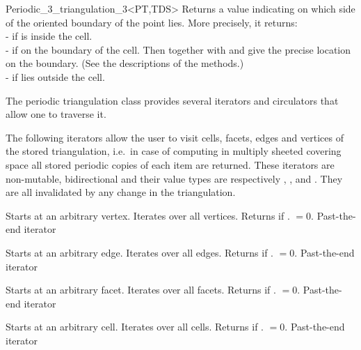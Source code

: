\begin{ccRefClass}{Periodic_3_triangulation_3<PT,TDS>}
{Returns a value indicating on which side of the oriented boundary
of  the point  lies. More precisely, it returns:\\
-  if  is inside the cell.\\
-  if  on the boundary of the cell. Then
 together with  and  give the precise location
on the boundary. (See the descriptions of the  methods.)\\ 
-  if  lies outside the cell.
}


The periodic triangulation class provides several iterators and circulators
that allow one to traverse it.


The following iterators allow the user to visit cells,
facets, edges and vertices of the stored triangulation, i.e.\ in case
of computing in multiply sheeted covering space all stored periodic
copies of each item are returned.
These iterators are non-mutable, bidirectional and
their value types are respectively , , 
and . They are all invalidated by any change in the
triangulation. 

{Starts at an arbitrary vertex. Iterates over all vertices. Returns
   if \ccVar. $=0$.}  
\ccGlue
{}
{Past-the-end iterator}

{Starts at an arbitrary edge. Iterates over all edges. Returns
   if \ccVar. $=0$.}
\ccGlue
{}
{Past-the-end iterator}

{Starts at an arbitrary facet. Iterates over all facets. Returns
   if \ccVar. $=0$.}
\ccGlue
{}
{Past-the-end iterator}

{Starts at an arbitrary cell. Iterates over all cells. Returns
   if \ccVar. $=0$.} 
\ccGlue
{}
{Past-the-end iterator}


\end{ccRefClass}

